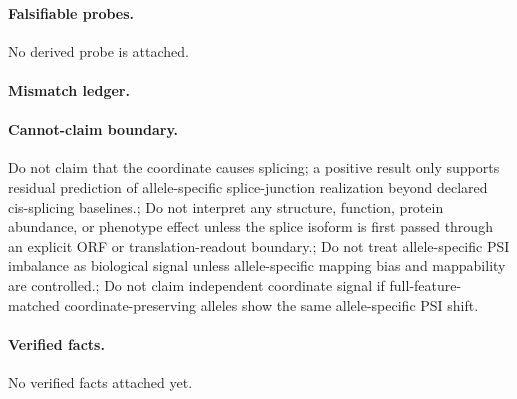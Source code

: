 \paragraph{Falsifiable probes.}
No derived probe is attached.

\paragraph{Mismatch ledger.}
\paragraph{Cannot-claim boundary.} Do not claim that the coordinate causes splicing; a positive result only supports residual prediction of allele-specific splice-junction realization beyond declared cis-splicing baselines.; Do not interpret any structure, function, protein abundance, or phenotype effect unless the splice isoform is first passed through an explicit ORF or translation-readout boundary.; Do not treat allele-specific PSI imbalance as biological signal unless allele-specific mapping bias and mappability are controlled.; Do not claim independent coordinate signal if full-feature-matched coordinate-preserving alleles show the same allele-specific PSI shift.

\paragraph{Verified facts.}
No verified facts attached yet.
